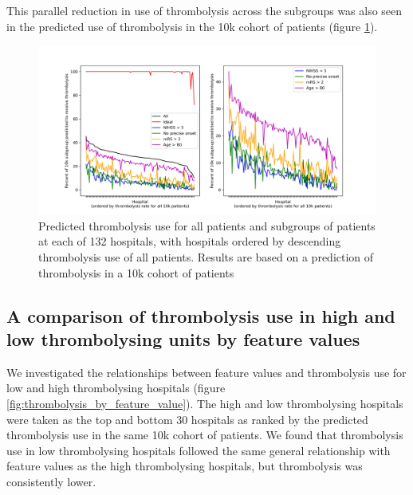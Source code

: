 This parallel reduction in use of thrombolysis across the subgroups was also seen in the predicted use of thrombolysis in the 10k cohort of patients (figure \ref{fig:subgroup_rate_2}).

\begin{figure}
\centering
\includegraphics[width=1\textwidth]{./images/15_10k_subgroup}
\caption{Predicted thrombolysis use for all patients and subgroups of patients at each of 132 hospitals, with hospitals ordered by descending thrombolysis use of all patients. Results are based on a prediction of thrombolysis in a 10k cohort of patients}
\label{fig:subgroup_rate_2}
\end{figure}


\subsection{A comparison of thrombolysis use in high and low thrombolysing units by feature values}

We investigated the relationships between feature values and thrombolysis use for low and high thrombolysing hospitals (figure \ref{fig:thrombolysis_by_feature_value}). The high and low thrombolysing hospitals were taken as the top and bottom 30 hospitals as ranked by the predicted thrombolysis use in the same 10k cohort of patients. We found that thrombolysis use in low thrombolysing hospitals followed the same general relationship with feature values as the high thrombolysing hospitals, but thrombolysis was consistently lower.

